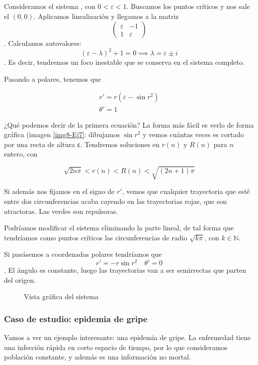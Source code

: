 \begin{example}
Consideramos el sistema , con $0 < ε < 1$. Buscamos los puntos críticos y nos sale el $(0,0)$. Aplicamos linealización y llegamos a la matriz \[ \begin{pmatrix}
ε & -1 \\ 1 & ε 
\end{pmatrix} \]. Calculamos autovalores: \[ (ε-λ)^2 + 1 = 0 \implies λ = ε\pm i \]. Es decir, tendremos un foco inestable que se conserva en el sistema completo.

Pasando a polares, tenemos que 

\begin{gather*}
r' = r(ε-\sin r^2) \\
θ' = 1 
\end{gather*}


¿Qué podemos decir de la primera ecuación? La forma más fácil es verlo de forma gráfica (imagen \ref{img8-Ej7}: dibujamos $\sin r^2$ y vemos cuántas veces es cortado por una recta de altura ε. Tendremos soluciones en $r(n)$ y $R(n)$ para $n$ entero, con 

\[ \sqrt{2nπ} < r(n) < R(n) < \sqrt{(2n+1)π} \]

Si además nos fijamos en el signo de $r'$, vemos que cualquier trayectoria que esté entre dos circunferencias acaba cayendo en las trayectorias rojas, que son atractoras. Las verdes son repulsoras.

Podríamos modificar el sistema eliminando la parte lineal, de tal forma que tendríamos como puntos críticos las circunferencias de radio $\sqrt{kπ}$, con $k∈ℕ$.

Si pasásemos a coordenadas polares tendríamos que \[ r'=-r\sin r^2\quad θ'=0 \]. El ángulo es constante, luego las trayectorias van a ser semirrectas que parten del origen.

\end{example}

\begin{figure}[hbtp]
\centering
{}
\label{img-Ej7}
\caption{Vista gráfica del sistema}
\end{figure}

\subsubsection{Caso de estudio: epidemia de gripe}

Vamos a ver un ejemplo interesante: una epidemia de gripe. La enfermedad tiene una infección rápida en corto espacio de tiempo, por lo que consideramos población constante, y además es una información no mortal. 

